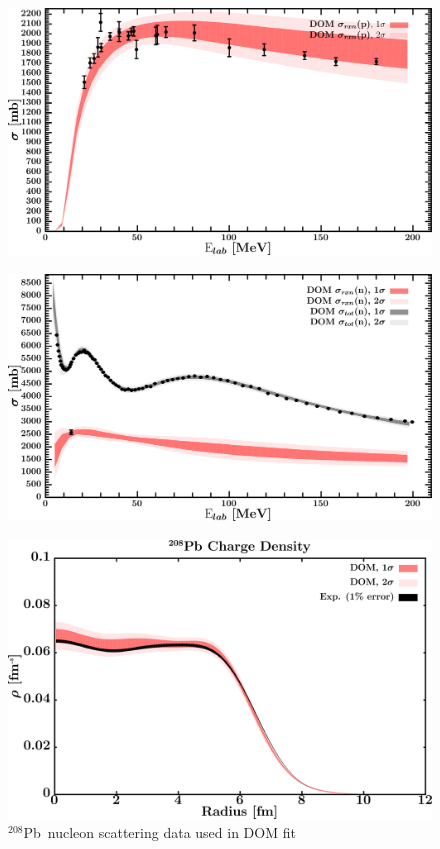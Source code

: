 \documentclass[twocolumn,secnumarabic,amssymb, nobibnotes, aps, prl,
superscriptaddress, nobalancelastpage]{revtex4}
\newcommand{\pbEight}{\ensuremath{^{208}}P\lowercase{b}}
\begin{document}
\begin{figure}[!htb]
\begin{minipage}{0.4\linewidth}
        \label{DOM_pb208_neutron_elastic}
    \end{minipage}
    \centering
    \begin{minipage}{0.4\linewidth}
        \centering
        \includegraphics[width=\linewidth]{figures/pb208_protonInelastic.png}
        \label{DOM_pb208_proton_inelastic}
    \end{minipage}\hspace{6pt}
    \begin{minipage}{0.4\linewidth}
        \centering
        \includegraphics[width=\linewidth]{figures/pb208_neutronInelastic.png}
        \label{DOM_pb208_neutron_inelastic}
    \end{minipage}
    \caption{\pbEight\ nucleon scattering data used in DOM fit}
    \label{DOM_pb208_scattering}
    \centering
    \begin{minipage}{0.4\linewidth}
        \centering
        \includegraphics[width=\linewidth]{figures/pb208_chargeDensity.png}

\end{minipage}
\end{figure}
\end{document}
